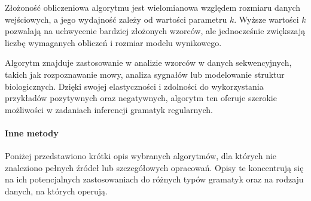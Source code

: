 Złożoność obliczeniowa algorytmu jest wielomianowa względem rozmiaru danych wejściowych, a jego wydajność zależy od wartości parametru \( k \). Wyższe wartości \( k \) pozwalają na uchwycenie bardziej złożonych wzorców, ale jednocześnie zwiększają liczbę wymaganych obliczeń i rozmiar modelu wynikowego.  

Algorytm znajduje zastosowanie w analizie wzorców w danych sekwencyjnych, takich jak rozpoznawanie mowy, analiza sygnałów lub modelowanie struktur biologicznych. Dzięki swojej elastyczności i zdolności do wykorzystania przykładów pozytywnych oraz negatywnych, algorytm ten oferuje szerokie możliwości w zadaniach inferencji gramatyk regularnych.


\paragraph*{Inne metody}  
Poniżej przedstawiono krótki opis wybranych algorytmów, dla których nie znaleziono pełnych źródeł lub szczegółowych opracowań. Opisy te koncentrują się na ich potencjalnych zastosowaniach do różnych typów gramatyk oraz na rodzaju danych, na których operują.  

